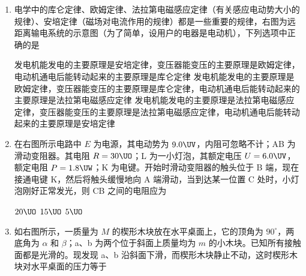 \documentclass[\gkver]{gaokaozhenti}
\begin{document}
\begin{enumerate}

\item
电学中的库仑定律、欧姆定律、法拉第电磁感应定律（有关感应电动势大小的规律）、安培定律（磁场对电流作用的规律）都是一些重要的规律，右图为远距离输电系统的示意图（为了简单，设用户的电器是电动机），下列选项中正确的是


{发电机能发电的主要原理是安培定律，变压器能变压的主要原理是欧姆定律，电动机通电后能转动起来的主要原理是库仑定律}
{发电机能发电的主要原理是欧姆定律，变压器能变压的主要原理是库仑定律，电动机通电后能转动起来的主要原理是法拉第电磁感应定律}
{发电机能发电的主要原理是法拉第电磁感应定律，变压器能变压的主要原理是法拉第电磁感应定律，电动机通电后能转动起来的主要原理是安培定律}


\item
在右图所示电路中 $E$ 为电源，其电动势为 $9.0\UV$，内阻可忽略不计；AB 为滑动变阻器。其电阻 $R = 30\UO$；L 为一小灯泡，其额定电压 $U = 6.0\UV$，额定电阻 $P = 1.8\UW$；K 为电键。开始时滑动变阻器的触头位于 B 端，现在接通电键 K，然后将触头缓慢地向 A 端滑动，当到达某一位置 C 处时，小灯泡刚好正常发光，则 CB 之间的电阻应为


\fourchoices[answer=B]
{$10\UO$}
{$20\UO$}
{$15\UO$}
{$5\UO$}


\item
如右图所示，一质量为 $M$ 的楔形木块放在水平桌面上，它的顶角为 $90^{\circ}$，两底角为 $\alpha$ 和 $\beta$；a、b 为两个位于斜面上质量均为 $m$ 的小木块。已知所有接触面都是光滑的。现发现 a、b 沿斜面下滑，而楔形木块静止不动，这时楔形木块对水平桌面的压力等于


\end{enumerate}
\end{document}

